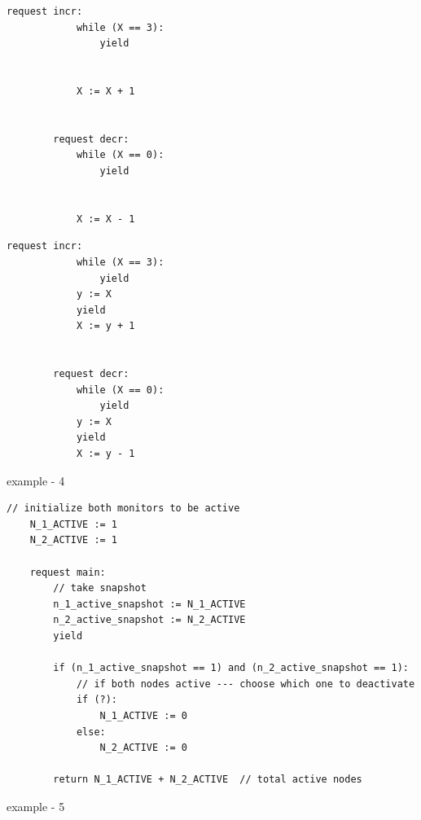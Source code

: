 \noindent
\begin{minipage}[t]{0.45\textwidth}
	\begin{lstlisting}[caption={Fred (serializable)}]
		request incr: 
		    while (X == 3):
		        yield
		        
		        
		    X := X + 1
		
		
		request decr: 
		    while (X == 0): 
		        yield
		        
		        
		    X := X - 1
	\end{lstlisting}
\end{minipage}
\hfill
\begin{minipage}[t]{0.45\textwidth}
	\begin{lstlisting}[caption={Fred2 (not serializable)}]
		request incr:
		    while (X == 3):
		        yield
		    y := X
		    yield
		    X := y + 1
		
		
		request decr: 
		    while (X == 0):
		        yield
		    y := X
		    yield
		    X := y - 1
	\end{lstlisting}
\end{minipage}
	

example - 4

\begin{minipage}[t]{1.0\textwidth}
\begin{lstlisting}[caption={Snapshot-based monitor deactivation (not serializable, as it can return a sume of 0 active monitors)}]
	// initialize both monitors to be active
    N_1_ACTIVE := 1
    N_2_ACTIVE := 1
	
    request main:
        // take snapshot
        n_1_active_snapshot := N_1_ACTIVE
        n_2_active_snapshot := N_2_ACTIVE
        yield
		
        if (n_1_active_snapshot == 1) and (n_2_active_snapshot == 1):
            // if both nodes active --- choose which one to deactivate 
            if (?): 
                N_1_ACTIVE := 0
            else:
                N_2_ACTIVE := 0

        return N_1_ACTIVE + N_2_ACTIVE  // total active nodes
\end{lstlisting}
\end{minipage}
	

\newpage

example - 5

